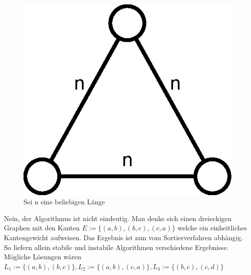 \documentclass[a4paper,11pt,twoside]{scrartcl}
\begin{document}
\begin{figure}
	\centering
	\includegraphics[width=0.5\linewidth]{Images/Beispiel}
	\caption{Sei n eine beliebigen Länge}
	\label{fig:Beispiel}
\end{figure}
Nein, der Algorithmus ist nicht eindeutig. Man denke sich einen dreieckigen Graphen mit den Kanten $E:=\{ (a,b),(b,c),(c,a) \}$ welche ein einheitliches Kantengewicht aufweisen. Das Ergebnis ist nun vom Sortierverfahren abhängig. So liefern allein stabile und instabile Algorithmen verschiedene Ergebnisse. Mögliche Lösungen wären $L_1:=\{ (a,b),(b,c) \},L_2:=\{ (a,b),(c,a)\},L_3:=\{ (b,c),(c,d) \}$
\end{document}
